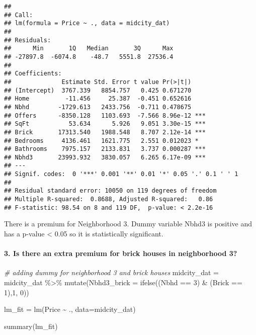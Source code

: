\documentclass[
]{article}
\newenvironment{Shaded}{\begin{snugshade}}{\end{snugshade}}
\newcommand{\AttributeTok}[1]{\textcolor[rgb]{0.77,0.63,0.00}{#1}}
\newcommand{\CommentTok}[1]{\textcolor[rgb]{0.56,0.35,0.01}{\textit{#1}}}
\newcommand{\DecValTok}[1]{\textcolor[rgb]{0.00,0.00,0.81}{#1}}
\newcommand{\FunctionTok}[1]{\textcolor[rgb]{0.00,0.00,0.00}{#1}}
\newcommand{\NormalTok}[1]{#1}
\newcommand{\OtherTok}[1]{\textcolor[rgb]{0.56,0.35,0.01}{#1}}
\newcommand{\SpecialCharTok}[1]{\textcolor[rgb]{0.00,0.00,0.00}{#1}}
\begin{document}
\begin{verbatim}
## 
## Call:
## lm(formula = Price ~ ., data = midcity_dat)
## 
## Residuals:
##      Min       1Q   Median       3Q      Max 
## -27897.8  -6074.8    -48.7   5551.8  27536.4 
## 
## Coefficients:
##              Estimate Std. Error t value Pr(>|t|)    
## (Intercept)  3767.339   8854.757   0.425 0.671270    
## Home          -11.456     25.387  -0.451 0.652616    
## Nbhd        -1729.613   2433.756  -0.711 0.478675    
## Offers      -8350.128   1103.693  -7.566 8.96e-12 ***
## SqFt           53.634      5.926   9.051 3.30e-15 ***
## Brick       17313.540   1988.548   8.707 2.12e-14 ***
## Bedrooms     4136.461   1621.775   2.551 0.012023 *  
## Bathrooms    7975.157   2133.831   3.737 0.000287 ***
## Nbhd3       23993.932   3830.057   6.265 6.17e-09 ***
## ---
## Signif. codes:  0 '***' 0.001 '**' 0.01 '*' 0.05 '.' 0.1 ' ' 1
## 
## Residual standard error: 10050 on 119 degrees of freedom
## Multiple R-squared:  0.8688, Adjusted R-squared:   0.86 
## F-statistic: 98.54 on 8 and 119 DF,  p-value: < 2.2e-16
\end{verbatim}

There is a premium for Neighborhood 3. Dummy variable Nbhd3 is positive
and has a p-value \textless{} 0.05 so it is statistically significant.

\hypertarget{is-there-an-extra-premium-for-brick-houses-in-neighborhood-3}{%
\paragraph{3. Is there an extra premium for brick houses in neighborhood
3?}\label{is-there-an-extra-premium-for-brick-houses-in-neighborhood-3}}

\begin{Shaded}
\begin{Highlighting}[]
\CommentTok{\# adding dummy for neighborhood 3 and brick houses}
\NormalTok{midcity\_dat }\OtherTok{=}\NormalTok{ midcity\_dat }\SpecialCharTok{\%\textgreater{}\%} \FunctionTok{mutate}\NormalTok{(}\AttributeTok{Nbhd3\_brick =} \FunctionTok{ifelse}\NormalTok{((Nbhd }\SpecialCharTok{==} \DecValTok{3}\NormalTok{) }\SpecialCharTok{\&}\NormalTok{ (Brick }\SpecialCharTok{==} \DecValTok{1}\NormalTok{),}\DecValTok{1}\NormalTok{, }\DecValTok{0}\NormalTok{))}


\NormalTok{lm\_fit }\OtherTok{=} \FunctionTok{lm}\NormalTok{(Price  }\SpecialCharTok{\textasciitilde{}}\NormalTok{ ., }\AttributeTok{data=}\NormalTok{midcity\_dat)}

\FunctionTok{summary}\NormalTok{(lm\_fit)}
\end{Highlighting}
\end{Shaded}
\end{document}
